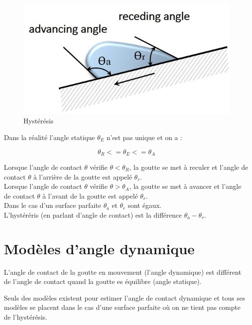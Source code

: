 \documentclass[french]{article}
\begin{document}
\begin{figure}[ht]
	\label{fig:hysteresis}
	\centering
	\includegraphics[scale = 0.8]{./image/hysteresis.jpg}
	\caption{Hystérésis}
\end{figure}
Dans la réalité l'angle statique $\theta_{E}$ n'est pas unique et on a :

\begin{equation}
	\theta_{R} <= \theta_{E} <= \theta_{A}
\end{equation}

Lorsque l'angle de contact $\theta$ vérifie $\theta < \theta_{R}$, la goutte se met à reculer et l'angle de contact $\theta$ à l'arrière de la goutte est appelé $\theta_{r}$.\\

Lorsque l'angle de contact $\theta$ vérifie $\theta > \theta_{A}$, la goutte se met à avancer et l'angle de contact $\theta$ à l'avant de la goutte est appelé $\theta_{r}$.\\

Dans le cas d'un surface parfaite $\theta_{a}$ et $\theta_{r}$ sont égaux.\\

L'hystéréris (en parlant d'angle de contact) est la différence $\theta_{a}-\theta_{r}$.

\section{Modèles d'angle dynamique}

L'angle de contact de la goutte en mouvement (l'angle dynamique) est différent de l'angle de contact quand la goutte es équilibre (angle statique).

Seuls des modèles existent pour estimer l'angle de contact dynamique et tous ses modèles se placent dans le cas d'une surface parfaite où on ne tient pas compte de l'hystérésis. 
\end{document}
